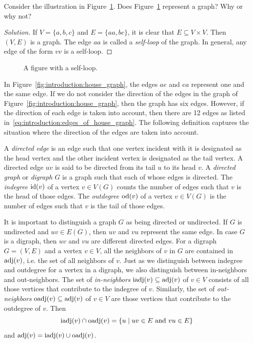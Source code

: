 \begin{example}
Consider the illustration in
Figure~\ref{fig:introduction:self_loop}. Does
Figure~\ref{fig:introduction:self_loop} represent a graph? Why or why not?
\end{example}

\begin{proof}[Solution]
If $V = \{ a, b, c \}$ and $E = \{ aa, bc \}$, it is clear that $E
\subseteq V \times V$. Then $(V, E)$ is a graph. The edge $aa$ is
called a \emph{self-loop} of the graph. In general, any edge of the
form $vv$ is a self-loop.
\end{proof}

\begin{figure}[!htbp]
\centering

\caption{A figure with a self-loop.}
\label{fig:introduction:self_loop}
\end{figure}

In Figure~\ref{fig:introduction:house_graph}, the edges $ae$ and $ea$
represent one and the same edge. If we do not consider the direction
of the edges in the graph of
Figure~\ref{fig:introduction:house_graph}, then the graph has six
edges. However, if the direction of each edge is taken into account,
then there are 12 edges as listed
in~\eqref{eq:introduction:edges_of_house_graph}. The following
definition captures the situation where the direction of the edges are
taken into account.

A \emph{directed edge} is an edge such that one vertex incident with it
is designated as the head vertex and the other incident vertex is
designated as the tail vertex. A directed edge $uv$ is said to be
directed from its tail $u$ to its head $v$. A \emph{directed graph} or
\emph{digraph} $G$ is a graph such that each of whose edges is
directed. The \emph{indegree} $\operatorname*{id}(v)$ of a vertex $v \in V(G)$ counts
the number of edges such that $v$ is the head of those edges. The
\emph{outdegree} $\operatorname*{od}(v)$ of a vertex $v \in V(G)$ is the number of
edges such that $v$ is the tail of those edges.
\index{$\id$}
\index{$\od$}

It is important to distinguish a graph $G$ as being directed or
undirected. If $G$ is undirected and $uv \in E(G)$, then $uv$ and $vu$
represent the same edge. In case $G$ is a digraph, then $uv$ and $vu$
are different directed edges. For a digraph $G = (V, E)$ and a vertex
$v \in V$, all the neighbors of $v$ in $G$ are contained in $\operatorname*{adj}(v)$,
i.e. the set of all neighbors of $v$. Just as we distinguish between
indegree and outdegree for a vertex in a digraph, we also distinguish
between in-neighbors and out-neighbors. The set of \emph{in-neighbors}
$\operatorname*{iadj}(v) \subseteq \operatorname*{adj}(v)$ of $v \in V$ consists of all those
vertices that contribute to the indegree of $v$. Similarly, the set
of \emph{out-neighbors} $\operatorname*{oadj}(v) \subseteq \operatorname*{adj}(v)$ of $v \in V$ are
those vertices that contribute to the outdegree of $v$. Then
\[
\operatorname*{iadj}(v) \cap \operatorname*{oadj}(v)
=
\{u \;|\; uv \in E \text{ and } vu \in E\}
\]
and $\operatorname*{adj}(v) = \operatorname*{iadj}(v) \cup \operatorname*{oadj}(v)$.
\index{$\iadj$}
\index{$\oadj$}

